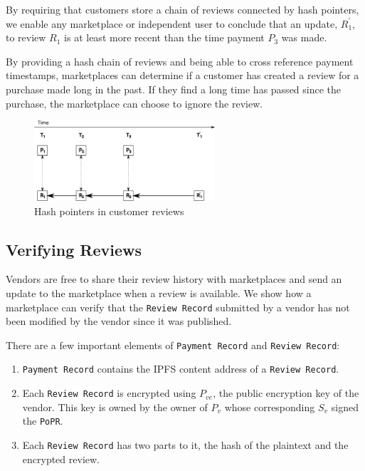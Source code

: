 \documentclass[a4paper]{article}
\begin{document}
By requiring that customers store a chain of reviews connected by hash
pointers, we enable any marketplace or independent user to conclude
that an update, $R^{'}_1$, to review $R_1$ is at least more recent
than the time payment $P_3$ was made.

By providing a hash chain of reviews and being able to cross reference
payment timestamps, marketplaces can determine if a customer has
created a review for a purchase made long in the past. If they find a
long time has passed since the purchase, the marketplace can choose to
ignore the review.

\begin{figure}
\centering
\includegraphics[width=0.6\textwidth]{../timestamps.eps}
\caption{\label{fig:hash-pointer-reviews}{Hash pointers in customer reviews}}
\end{figure}

\subsection{Verifying Reviews}

Vendors are free to share their review history with marketplaces and
send an update to the marketplace when a review is available. We show
how a marketplace can verify that the \texttt{Review Record} submitted
by a vendor has not been modified by the vendor since it was
published.

There are a few important elements of \texttt{Payment Record} and
\texttt{Review Record}:

\begin{enumerate}
\item \texttt{Payment Record} contains the IPFS content address of a
  \texttt{Review Record}.
  
\item Each \texttt{Review Record} is encrypted using $P_{ve}$, the
  public encryption key of the vendor. This key is owned by the owner
  of $P_v$ whose corresponding $S_v$ signed the \texttt{PoPR}.

\item Each \texttt{Review Record} has two parts to it, the hash of the
  plaintext and the encrypted review.
\end{enumerate}
\end{document}
